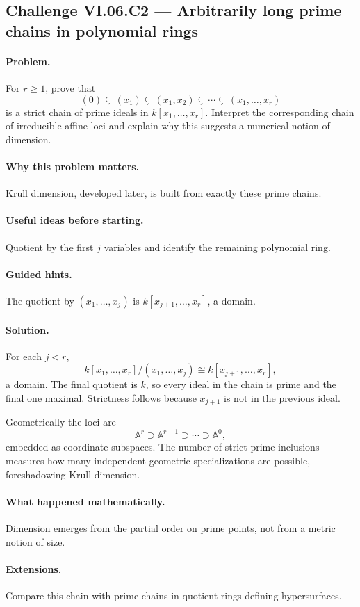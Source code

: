 \subsection*{Challenge VI.06.C2 --- Arbitrarily long prime chains in polynomial rings}
\label{chal:vi-06-c2}

\paragraph{Problem.}
For \(r\ge1\), prove that
\[
(0)\subsetneq(x_1)\subsetneq(x_1,x_2)\subsetneq\cdots\subsetneq(x_1,\dots,x_r)
\]
is a strict chain of prime ideals in \(k[x_1,\dots,x_r]\).  Interpret the corresponding
chain of irreducible affine loci and explain why this suggests a numerical notion of
dimension.

\ifdefined\FullProblemDossiers
\paragraph{Why this problem matters.}
Krull dimension, developed later, is built from exactly these prime chains.

\paragraph{Useful ideas before starting.}
Quotient by the first \(j\) variables and identify the remaining polynomial ring.

\paragraph{Guided hints.}
The quotient by \((x_1,\dots,x_j)\) is \(k[x_{j+1},\dots,x_r]\), a domain.

\paragraph{Solution.}
For each \(j<r\),
\[
k[x_1,\dots,x_r]/(x_1,\dots,x_j)
\cong k[x_{j+1},\dots,x_r],
\]
a domain.  The final quotient is \(k\), so every ideal in the chain is prime and the final
one maximal.  Strictness follows because \(x_{j+1}\) is not in the previous ideal.

Geometrically the loci are
\[
\mathbb A^r\supset\mathbb A^{r-1}\supset\cdots\supset\mathbb A^0,
\]
embedded as coordinate subspaces.  The number of strict prime inclusions measures how many
independent geometric specializations are possible, foreshadowing Krull dimension.

\paragraph{What happened mathematically.}
Dimension emerges from the partial order on prime points, not from a metric notion of size.

\paragraph{Extensions.}
Compare this chain with prime chains in quotient rings defining hypersurfaces.
\fi
